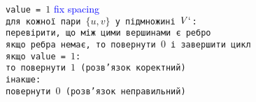 \documentclass[14pt]{article}
\begin{document}
\begin{spacing}{1.175}
        \quad \texttt{value = \(1\)} \textcolor{blue}{ fix spacing} 
        \\
        
        \quad \texttt{для кожної пари \( \{u, v\}\) у підмножині \(V`\):}
        \\
        
        \quad \texttt{\quad перевірити, що між цими вершинами є ребро}
        \\
        
        \quad \texttt{\quad якщо ребра немає, то повернути \(0\) і завершити цикл}
        \\
        
        \quad \texttt{якщо value = \(1\):}
        \\
        
        \quad \texttt{\quad то повернути \(1\) (розв'язок коректний)}
        \\

        \quad \texttt{інакше:}
        \\
        
        \quad \texttt{\quad повернути \(0\) (розв'язок неправильний)}\\
        \\
        

\end{spacing}
\end{document}
